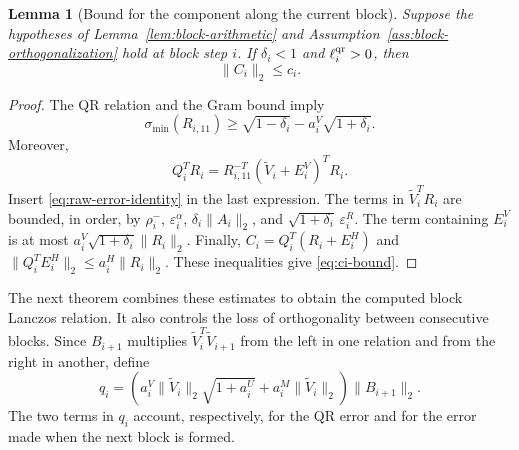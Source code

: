 \documentclass[11pt]{article}
\newtheorem{lemma}{Lemma}
\theoremstyle{definition}
\newcommand{\eps}{\varepsilon}
\begin{document}
\begin{lemma}[Bound for the component along the current block]
\label{lem:current-block-coefficient}
Suppose the hypotheses of Lemma~\ref{lem:block-arithmetic} and
Assumption~\ref{ass:block-orthogonalization} hold at block step $i$.  If
$\delta_i<1$ and $\ell_i^{\rm qr}>0$, then
\begin{equation}
 \|C_i\|_2\le c_i.
 \label{eq:ci-bound}
\end{equation}
\end{lemma}

\begin{proof}
The QR relation and the Gram bound imply
\[
 \sigma_{\min}(R_{i,11})
 \ge \sqrt{1-\delta_i}-a_i^V\sqrt{1+\delta_i}.
\]
Moreover,
\[
 Q_i^TR_i
 =R_{i,11}^{-T}(\widetilde V_i+E_i^V)^TR_i.
\]
Insert \eqref{eq:raw-error-identity} in the last expression.  The terms in
$\widetilde V_i^TR_i$ are bounded, in order, by $\rho_i^-$,
$\eps_i^\alpha$, $\delta_i\|A_i\|_2$, and
$\sqrt{1+\delta_i}\,\eps_i^R$.  The term containing $E_i^V$ is at most
$a_i^V\sqrt{1+\delta_i}\|R_i\|_2$.  Finally,
$C_i=Q_i^T(R_i+E_i^H)$ and
$\|Q_i^TE_i^H\|_2\le a_i^H\|R_i\|_2$.  These inequalities give
\eqref{eq:ci-bound}.
\end{proof}

The next theorem combines these estimates to obtain the computed block
Lanczos relation.  It also controls the loss of orthogonality between
consecutive blocks.  Since $B_{i+1}$ multiplies
$\widetilde V_i^T\widetilde V_{i+1}$ from the left in one relation and from
the right in another, define
\begin{equation}
 q_i=\left(
 a_i^V\|\widetilde V_i\|_2\sqrt{1+a_i^U}
 +a_i^M\|\widetilde V_i\|_2\right)\|B_{i+1}\|_2.
 \label{eq:qi-definition}
\end{equation}
The two terms in $q_i$ account, respectively, for the QR error and for the
error made when the next block is formed.
\end{document}

